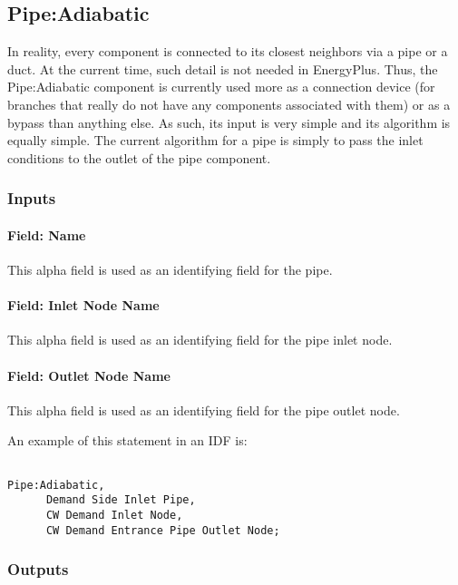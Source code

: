 \subsection{Pipe:Adiabatic}\label{pipeadiabatic}

In reality, every component is connected to its closest neighbors via a pipe or a duct. At the current time, such detail is not needed in EnergyPlus. Thus, the Pipe:Adiabatic component is currently used more as a connection device (for branches that really do not have any components associated with them) or as a bypass than anything else. As such, its input is very simple and its algorithm is equally simple. The current algorithm for a pipe is simply to pass the inlet conditions to the outlet of the pipe component.

\subsubsection{Inputs}\label{inputs-4-019}

\paragraph{Field: Name}\label{field-name-4-016}

This alpha field is used as an identifying field for the pipe.

\paragraph{Field: Inlet Node Name}\label{field-inlet-node-name-001}

This alpha field is used as an identifying field for the pipe inlet node.

\paragraph{Field: Outlet Node Name}\label{field-outlet-node-name-002}

This alpha field is used as an identifying field for the pipe outlet node.

An example of this statement in an IDF is:

\begin{lstlisting}

Pipe:Adiabatic,
      Demand Side Inlet Pipe,
      CW Demand Inlet Node,
      CW Demand Entrance Pipe Outlet Node;
\end{lstlisting}

\subsubsection{Outputs}\label{outputs-4-009}

